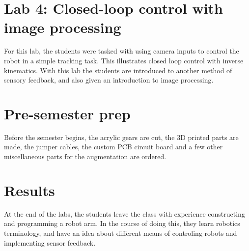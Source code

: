 \section{Lab  4: Closed-loop control with image processing}

For this lab, the students were tasked with using camera inputs to control the robot in a simple tracking task. This illustrates closed loop control with inverse kinematics. With this lab the students are introduced to another method of sensory feedback, and also given an  introduction to image processing.



\section{Pre-semester prep}
 
Before the semester begins, the acrylic gears are cut, the 3D printed parts are made, the jumper cables, the custom PCB circuit board and a few other miscellaneous parts for the augmentation are ordered.


\section{Results}

At the end of the labs, the students leave the class with experience constructing and programming a robot arm. In the course of doing this, they learn robotics terminology, and have an idea about different means of controling robots and implementing sensor feedback. 
